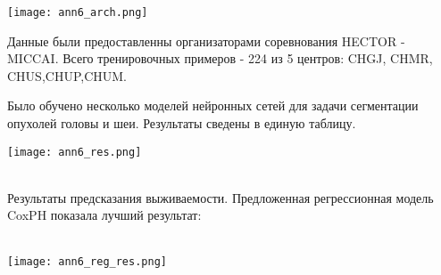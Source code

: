     \begin{minipage}{1.0\linewidth}
        \begin{center} 
        \texttt{[image: ann6\_arch.png]}\\
        
     \end{center}

    \end{minipage}

Данные были предоставленны организаторами соревнования HECTOR - MICCAI. Всего 
тренировочных примеров - 224 из 5 центров: CHGJ, CHMR, CHUS,CHUP,CHUM.
\par
Было обучено несколько моделей нейронных сетей для задачи сегментации опухолей головы и шеи. 
Результаты сведены в единую таблицу.
\begin{minipage}{1.0\linewidth}
    \begin{center}
        
    
    \texttt{[image: ann6\_res.png]}\\
\end{center}
\end{minipage}
\\

Результаты предсказания выживаемости. Предложенная регрессионная модель CoxPH показала 
лучший результат: \\
\\
\begin{minipage}{1.0\linewidth}
    \begin{center}
        
   
    \texttt{[image: ann6\_reg\_res.png]}\\
\end{center}
\end{minipage}

